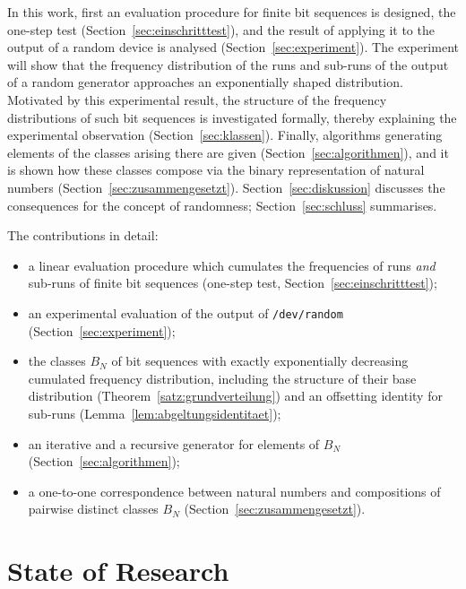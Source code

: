 \documentclass[11pt,a4paper]{scrartcl}
\theoremstyle{plain}
\theoremstyle{definition}
\theoremstyle{remark}
\begin{document}
In this work, first an evaluation procedure for finite bit sequences
is designed, the one-step test (Section~\ref{sec:einschritttest}), and
the result of applying it to the output of a random device is analysed
(Section~\ref{sec:experiment}). The experiment will show that the
frequency distribution of the runs and sub-runs of the output of a
random generator approaches an exponentially shaped distribution.
Motivated by this experimental result, the structure of the frequency
distributions of such bit sequences is investigated formally, thereby
explaining the experimental observation (Section~\ref{sec:klassen}).
Finally, algorithms generating elements of the classes arising there
are given (Section~\ref{sec:algorithmen}), and it is shown how these
classes compose via the binary representation of natural numbers
(Section~\ref{sec:zusammengesetzt}). Section~\ref{sec:diskussion}
discusses the consequences for the concept of randomness;
Section~\ref{sec:schluss} summarises.

The contributions in detail:
\begin{itemize}
  \item a linear evaluation procedure which cumulates the frequencies
        of runs \emph{and} sub-runs of finite bit sequences (one-step
        test, Section~\ref{sec:einschritttest});
  \item an experimental evaluation of the output of \texttt{/dev/random}
        (Section~\ref{sec:experiment});
  \item the classes $B_N$ of bit sequences with exactly exponentially
        decreasing cumulated frequency distribution, including the
        structure of their base distribution
        (Theorem~\ref{satz:grundverteilung}) and an offsetting identity
        for sub-runs (Lemma~\ref{lem:abgeltungsidentitaet});
  \item an iterative and a recursive generator for elements of $B_N$
        (Section~\ref{sec:algorithmen});
  \item a one-to-one correspondence between natural numbers and
        compositions of pairwise distinct classes $B_N$
        (Section~\ref{sec:zusammengesetzt}).
\end{itemize}

\section{State of Research}\label{sec:stand}
\end{document}
